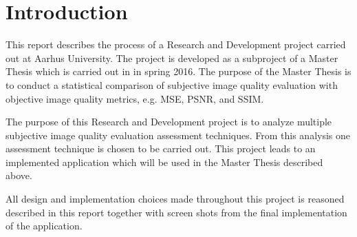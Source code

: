 \graphicspath{{Chapters/Introduction/}}

\chapter{Introduction}
This report describes the process of a Research and Development project carried out at Aarhus University. The project is developed as a subproject of a Master Thesis which is carried out in in spring 2016. The purpose of the Master Thesis is to conduct a statistical comparison of subjective image quality evaluation with objective image quality metrics, e.g. MSE, PSNR, and SSIM.

The purpose of this Research and Development project is to analyze multiple subjective image quality evaluation assessment techniques. From this analysis one assessment technique is chosen to be carried out. This project leads to an implemented application which will be used in the Master Thesis described above.

All design and implementation choices made throughout this project is reasoned described in this report together with screen shots from the final implementation of the application.